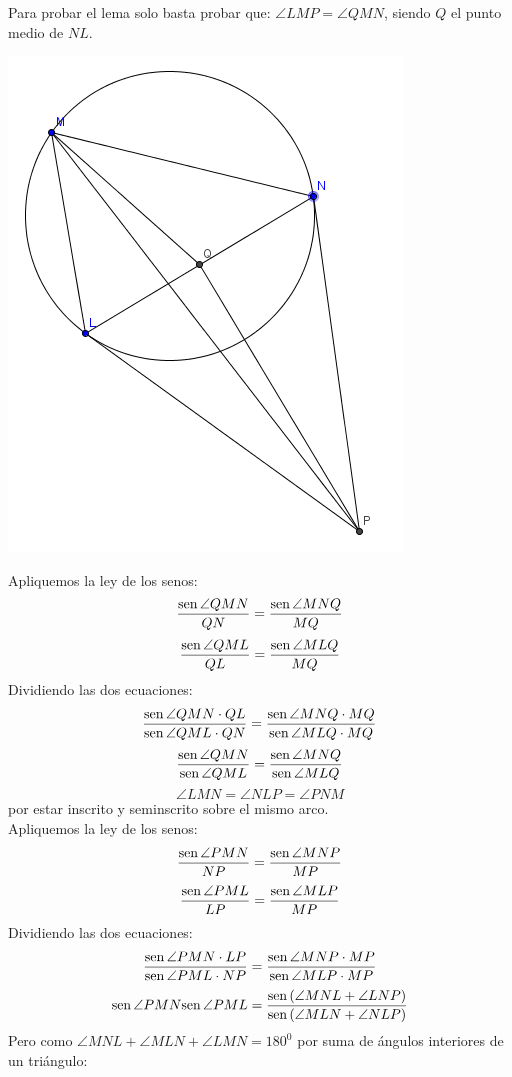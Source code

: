 \documentclass{book}
\newcommand{\sen}{\mathop{\rm sen}\nolimits} %
\begin{document}
\begin{enumerate}
        Para probar el lema solo basta probar que: $\angle LMP=\angle QMN$, siendo $Q$ el punto medio de $NL$.
        \begin{center}
            \includegraphics[scale=1]{imagenes/Geometria/25,2.png}
        \end{center}
        Apliquemos la ley de los senos:
        $${\sen {\angle QMN}\over QN}={\sen {\angle MNQ}\over MQ}$$
        $${\sen {\angle QML}\over QL}={\sen {\angle MLQ}\over MQ}$$
        Dividiendo las dos ecuaciones:
        $$\frac{\sen {\angle QMN}\cdot QL}{\sen {\angle QML}\cdot QN}=\frac{\sen {\angle MNQ}\cdot MQ}{\sen {\angle MLQ}\cdot MQ}$$
        $$\frac{\sen {\angle QMN}}{\sen {\angle QML}}=\frac{\sen {\angle MNQ}}{\sen {\angle MLQ}}$$
        $$\angle LMN=\angle NLP=\angle PNM$$
        por estar inscrito y seminscrito sobre el mismo arco.\\
        Apliquemos la ley de los senos:
        $${\sen {\angle PMN}\over NP}={\sen {\angle MNP}\over MP}$$
        $${\sen {\angle PML}\over LP}={\sen {\angle MLP}\over MP}$$
        Dividiendo las dos ecuaciones:
        $$\frac{\sen {\angle PMN}\cdot LP}{\sen {\angle PML}\cdot NP}=\frac{\sen {\angle MNP}\cdot MP}{\sen {\angle MLP}\cdot MP}$$
        $${\sen {\angle PMN}}{\sen {\angle PML}}=\frac{\sen {(\angle MNL+\angle LNP)}}{\sen {(\angle MLN+\angle NLP)}}$$
        Pero como $\angle MNL+\angle MLN+\angle LMN=180^0$ por suma de ángulos interiores de un triángulo:

\end{enumerate}
\end{document}
